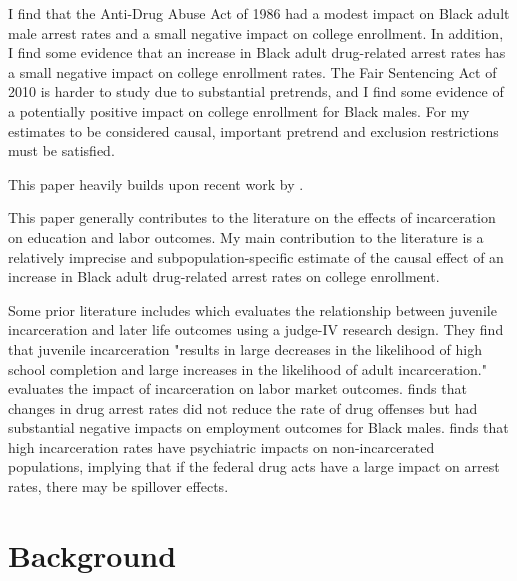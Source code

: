\documentclass{article}
\begin{document}

I find that the Anti-Drug Abuse Act of 1986 had a modest impact on Black adult male arrest rates and a small negative impact on college enrollment. In addition, I find some evidence that an increase in Black adult drug-related arrest rates has a small negative impact on college enrollment rates. The Fair Sentencing Act of 2010 is harder to study due to substantial pretrends, and I find some evidence of a potentially positive impact on college enrollment for Black males. For my estimates to be considered causal, important pretrend and exclusion restrictions must be satisfied.

This paper heavily builds upon recent work by \cite{britton2022}.

This paper generally contributes to the literature on the effects of incarceration on education and labor outcomes. My main contribution to the literature is a relatively imprecise and subpopulation-specific estimate of the causal effect of an increase in Black adult drug-related arrest rates on college enrollment.

Some prior literature includes \cite{aizer} which evaluates the relationship between juvenile incarceration and later life outcomes using a judge-IV research design. They find that juvenile incarceration "results in large decreases in the likelihood of high school completion and large increases in the likelihood of adult incarceration." \cite{western} evaluates the impact of incarceration on labor market outcomes. \cite{mitchell2016effect} finds that changes in drug arrest rates did not reduce the rate of drug offenses but had substantial negative impacts on employment outcomes for Black males. \cite{hatzenbuehler2015collateral} finds that high incarceration rates have psychiatric impacts on non-incarcerated populations, implying that if the federal drug acts have a large impact on arrest rates, there may be spillover effects.


\section{Background}
\end{document}
